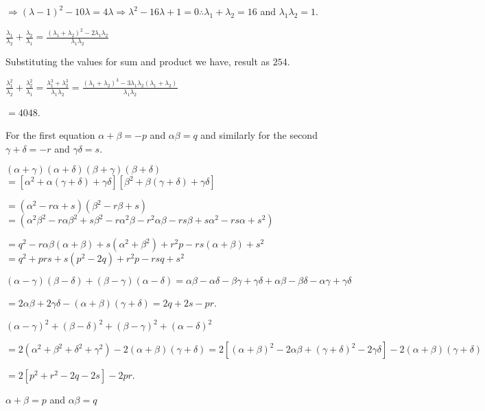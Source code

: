   $\Rightarrow (\lambda - 1)^2 - 10\lambda = 4\lambda \Rightarrow \lambda^2 - 16\lambda + 1 = 0\therefore
  \lambda_1 + \lambda_2 = 16$ and $\lambda_1\lambda_2 = 1$.
  \startitemize[i]
  \item $\frac{\lambda_1}{\lambda_2} + \frac{\lambda_2}{\lambda_1} = \frac{(\lambda_1 + \lambda_2)^2 -
    2\lambda_1\lambda_2}{\lambda_1\lambda_2}$

    Substituting the values for sum and product we have, result as $254$.
  \item $\frac{\lambda_1^2}{\lambda_2} + \frac{\lambda_2^2}{\lambda_1} = \frac{\lambda_1^3 +
    \lambda_2^3}{\lambda_1\lambda_2} = \frac{(\lambda_1 + \lambda_2)^3 - 3\lambda_1\lambda_2(\lambda_1 +
    \lambda_2)}{\lambda_1\lambda_2}$

    $= 4048$.
  \stopitemize
\item For the first equation $\alpha + \beta = -p$ and $\alpha\beta = q$ and similarly for the second
  $\gamma + \delta = -r$ and $\gamma\delta = s$.
  \startitemize[i]
  \item $(\alpha + \gamma)(\alpha + \delta)(\beta + \gamma)(\beta + \delta)$
    $= [\alpha^2 + \alpha(\gamma + \delta) + \gamma\delta][\beta^2 + \beta(\gamma + \delta) + \gamma\delta]$

    $= (\alpha^2 - r\alpha + s)(\beta^2 - r\beta + s)$
    $= (\alpha^2\beta^2 - r\alpha\beta^2 + s\beta^2 - r\alpha^2\beta - r^2\alpha\beta - rs\beta + s\alpha^2 - rs\alpha +
    s^2)$

    $= q^2 - r\alpha\beta(\alpha + \beta) + s(\alpha^2 + \beta^2) + r^2p - rs(\alpha + \beta) + s^2$
    $= q^2 + prs + s(p^2 - 2q) + r^2p - rsq + s^2$
  \item $(\alpha - \gamma)(\beta - \delta) + (\beta - \gamma)(\alpha - \delta) = \alpha\beta -
    \alpha\delta - \beta\gamma + \gamma\delta + \alpha\beta - \beta\delta -\alpha\gamma + \gamma\delta$

    $= 2\alpha\beta + 2\gamma\delta - (\alpha + \beta)(\gamma + \delta) = 2q + 2s - pr$.
  \item $(\alpha - \gamma)^2 + (\beta - \delta)^2 + (\beta - \gamma)^2 + (\alpha - \delta)^2$

    $= 2(\alpha^2 + \beta^2 + \delta^2 + \gamma^2) - 2(\alpha + \beta)(\gamma + \delta) = 2[(\alpha +
    \beta)^2 - 2\alpha\beta + (\gamma + \delta)^2 - 2\gamma\delta] - 2(\alpha + \beta)(\gamma + \delta)$

    $= 2[p^2 + r^2 - 2q - 2s] - 2pr$.
  \stopitemize
\item $\alpha + \beta = p$ and $\alpha\beta = q$

